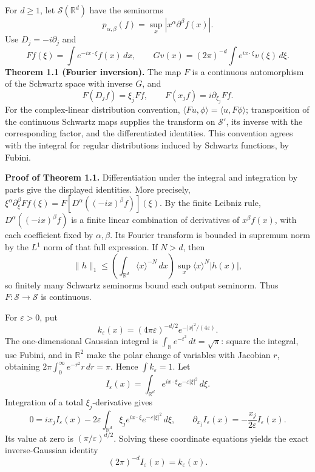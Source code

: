 \documentclass[
  11pt,
]{article}
\begin{document}
For \(d\geq1\), let \(\mathcal S(\mathbb R^d)\) have the seminorms \[
p_{\alpha,\beta}(f)=\sup_x|x^\alpha\partial^\beta f(x)|.
\] Use \(D_j=-i\partial_j\) and \[
Ff(\xi)=\int e^{-ix\cdot\xi}f(x)\,dx,
\qquad
Gv(x)=(2\pi)^{-d}\int e^{ix\cdot\xi}v(\xi)\,d\xi.
\] \textbf{Theorem 1.1 (Fourier inversion).} The map \(F\) is a
continuous automorphism of the Schwartz space with inverse \(G\), and \[
F(D_jf)=\xi_jFf,\qquad F(x_jf)=i\partial_{\xi_j}Ff.
\] For the complex-linear distribution convention,
\(\langle Fu,\phi\rangle=\langle u,F\phi\rangle\); transposition of the
continuous Schwartz maps supplies the transform on \(\mathcal S'\), its
inverse with the corresponding factor, and the differentiated
identities. This convention agrees with the integral for regular
distributions induced by Schwartz functions, by Fubini.

\textbf{Proof of Theorem 1.1.} Differentiation under the integral and
integration by parts give the displayed identities. More precisely,
\(\xi^\alpha\partial_\xi^\beta Ff(\xi)=F[D^\alpha((-ix)^\beta f)](\xi)\).
By the finite Leibniz rule, \(D^\alpha((-ix)^\beta f)\) is a finite
linear combination of derivatives of \(x^\beta f(x)\), with each
coefficient fixed by \(\alpha,\beta\). Its Fourier transform is bounded
in supremum norm by the \(L^1\) norm of that full expression. If
\(N>d\), then \[
\|h\|_1\leq\left(\int_{\mathbb R^d}\langle x\rangle^{-N}\,dx\right)
\sup_x\langle x\rangle^N|h(x)|,
\] so finitely many Schwartz seminorms bound each output seminorm. Thus
\(F:\mathcal S\to\mathcal S\) is continuous.

For \(\varepsilon>0\), put \[
k_\varepsilon(x)=(4\pi\varepsilon)^{-d/2}e^{-|x|^2/(4\varepsilon)}.
\] The one-dimensional Gaussian integral is
\(\int_{\mathbb R}e^{-t^2}\,dt=\sqrt{\pi}\): square the integral, use
Fubini, and in \(\mathbb R^2\) make the polar change of variables with
Jacobian \(r\), obtaining \(2\pi\int_0^\infty e^{-r^2}r\,dr=\pi\). Hence
\(\int k_\varepsilon=1\). Let \[
I_\varepsilon(x)=\int_{\mathbb R^d}e^{ix\cdot\xi}e^{-\varepsilon|\xi|^2}\,d\xi.
\] Integration of a total \(\xi_j\)-derivative gives \[
0=ix_jI_\varepsilon(x)-2\varepsilon
\int_{\mathbb R^d}\xi_j e^{ix\cdot\xi}e^{-\varepsilon|\xi|^2}\,d\xi,
\qquad
\partial_{x_j}I_\varepsilon(x)=-\frac{x_j}{2\varepsilon}I_\varepsilon(x).
\] Its value at zero is \((\pi/\varepsilon)^{d/2}\). Solving these
coordinate equations yields the exact inverse-Gaussian identity \[
(2\pi)^{-d}I_\varepsilon(x)=k_\varepsilon(x).
\]
\end{document}
